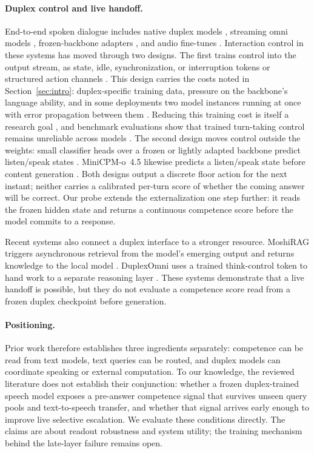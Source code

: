 \paragraph{Duplex control and live handoff.}
End-to-end spoken dialogue includes native duplex models
\citep{nguyen2023generative,defossez2024moshi,zeng2024glm4voice,
bayling2026duplex}, streaming omni models
\citep{xu2025qwen25omni,openbmb2026minicpmo}, frozen-backbone adapters
\citep{wang2024freezeomni}, and audio fine-tunes
\citep{chu2024qwen2audio}. Interaction control in these systems has
moved through two designs. The first trains control into the output
stream, as state, idle, synchronization, or interruption tokens
\citep{wang2024fsm,zhang2024duplex,veluri2024syncllm,
ma2024lslm,fu2024vita,yu2024salmonnomni} or structured action channels
\citep{zhang2026duplexsla}. This design carries the costs noted in
Section~\ref{sec:intro}: duplex-specific training data, pressure on
the backbone's language ability, and in some deployments two model
instances running at once with error propagation between them
\citep{fu2024vita,yu2024salmonnomni}. Reducing this training cost is
itself a research goal \citep{xu2024minimal}, and benchmark
evaluations show that trained turn-taking control remains unreliable
across models \citep{lin2025fdb}. The second design moves control
outside the weights: small classifier heads over a frozen or lightly
adapted backbone predict listen/speak states
\citep{wang2024freezeomni,chen2025minmo,liao2025flexduo}.
MiniCPM-o~4.5 likewise predicts a listen/speak state before content
generation \citep{openbmb2026minicpmo}. Both designs output a discrete
floor action for the next instant; neither carries a calibrated
per-turn score of whether the coming answer will be correct. Our probe
extends the externalization one step further: it reads the frozen
hidden state and returns a continuous competence score before the
model commits to a response.

Recent systems also connect a duplex interface to a stronger resource.
MoshiRAG triggers asynchronous retrieval from the model's emerging
output and returns knowledge to the local model
\citep{chien2026moshirag}. DuplexOmni uses a trained think-control
token to hand work to a separate reasoning layer
\citep{huang2026duplexomni}. These systems demonstrate that a live
handoff is possible, but they do not evaluate a competence score read
from a frozen duplex checkpoint before generation.

\paragraph{Positioning.}
Prior work therefore establishes three ingredients separately:
competence can be read from text models, text queries can be routed,
and duplex models can coordinate speaking or external computation.
To our knowledge, the reviewed literature does not establish their
conjunction: whether a frozen duplex-trained speech model exposes a
pre-answer competence signal that survives unseen query pools and
text-to-speech transfer, and whether that signal arrives early enough
to improve live selective escalation. We evaluate these conditions
directly. The claims are about readout robustness and system utility;
the training mechanism behind the late-layer failure remains open.
